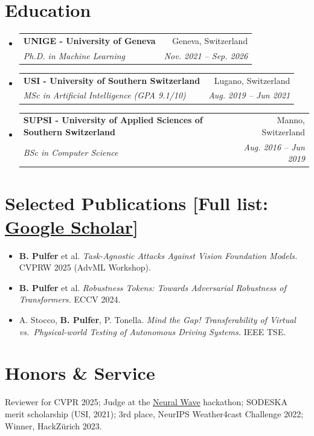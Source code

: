 \documentclass[letterpaper,11pt]{article}
\makeatletter
\newcommand{\resumeItem}[1]{
  \item\small{
    {#1 \vspace{-2pt}}
  }
}
\newcommand{\resumeSubheading}[4]{
  \vspace{-2pt}\item
    \begin{tabular*}{0.97\textwidth}[t]{l@{\extracolsep{\fill}}r}
      \textbf{#1} & #2 \\
      \textit{\small#3} & \textit{\small #4} \\
    \end{tabular*}\vspace{-7pt}
}
\newcommand{\resumeSubHeadingListStart}{\begin{itemize}[leftmargin=0.15in, label={}]}
\newcommand{\resumeSubHeadingListEnd}{\end{itemize}}
\newcommand{\resumeItemListStart}{\begin{itemize}}
\newcommand{\resumeItemListEnd}{\end{itemize}\vspace{-5pt}}
\makeatother
\begin{document}
\section{Education}
  \resumeSubHeadingListStart
    \resumeSubheading
      {UNIGE - University of Geneva}{Geneva, Switzerland}
      {Ph.D. in Machine Learning}{Nov. 2021 -- Sep. 2026}
    \resumeSubheading
      {USI - University of Southern Switzerland}{Lugano, Switzerland}
      {MSc in Artificial Intelligence (GPA 9.1/10)}{Aug. 2019 -- Jun 2021}
    \resumeSubheading
      {SUPSI - University of Applied Sciences of Southern Switzerland}{Manno, Switzerland}
      {BSc in Computer Science}{Aug. 2016 -- Jun 2019}
  \resumeSubHeadingListEnd


\section{Selected Publications \small{[Full list: \href{https://brianpulfer.ch/scholar}{Google Scholar}]}}
    \resumeItemListStart
        \resumeItem{\textbf{B. Pulfer} et al. \textit{Task-Agnostic Attacks Against Vision Foundation Models.} CVPRW 2025 (AdvML Workshop).}
    
        \resumeItem{\textbf{B. Pulfer} et al. \textit{Robustness Tokens: Towards Adversarial Robustness of Transformers.} ECCV 2024.}
        
        \resumeItem{A. Stocco, \textbf{B. Pulfer}, P. Tonella. \textit{Mind the Gap! Transferability of Virtual vs.\ Physical-world Testing of Autonomous Driving Systems.} IEEE TSE.}

    \resumeItemListEnd

\section{Honors \& Service}
  \begin{itemize}[leftmargin=0.15in, label={}]
    \small{\item{
      Reviewer for CVPR 2025; Judge at the \href{https://neuralwave.ch}{Neural Wave} hackathon; SODESKA merit scholarship (USI, 2021); 3rd place, NeurIPS Weather4cast Challenge 2022; Winner, HackZ\"urich 2023.
    }}
  \end{itemize}

\end{document}
